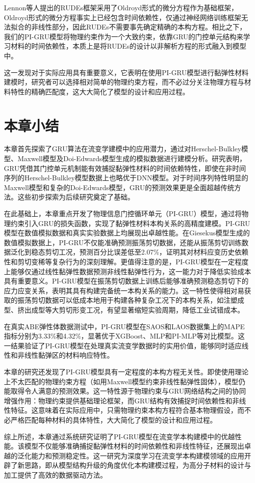 Lennon等人提出的RUDEs框架采用了Oldroyd形式的微分方程作为基础框架，Oldroyd形式的微分方程事实上已经包含时间依赖性，仅通过神经网络训练框架无法拟合的非线性部分，因此RUDEs不需要事先确定精确的本构方程\cite{lennonScientificMachineLearning2023a}。相比之下，我们的PI-GRU模型将物理约束作为一个大致约束，依靠GRU的门控单元结构来学习材料的时间依赖性，本质上是将RUDEs的设计以非解析方程的形式融入到模型中。

这一发现对于实际应用具有重要意义，它表明在使用PI-GRU模型进行黏弹性材料建模时，研究者可以选择相对简单的物理约束方程，而不必过分关注物理方程与材料特性的精确匹配度，这大大简化了模型的设计和应用过程。


\section{本章小结}

本章首先探索了GRU算法在流变学建模中的应用潜力，通过对Herschel-Bulkley模型、Maxwell模型及Doi-Edwards模型生成的模拟数据进行建模分析。研究表明，GRU凭借其门控单元机制能有效捕捉黏弹性材料的时间依赖特性，即使在非时间序列的Herschel-Bulkley模型数据上也略优于DNN模型。对于时间序列特性明显的Maxwell模型和复杂的Doi-Edwards模型，GRU的预测效果更是全面超越传统方法。这些初步探索为后续研究奠定了基础。

在此基础上，本章重点开发了物理信息门控循环单元（PI-GRU）模型，通过将物理约束引入GRU的损失函数，实现了黏弹性材料本构关系的高精度建模。PI-GRU模型在数值模拟数据和真实实验数据上均展现出卓越性能。在Giesekus模型生成的数值模拟数据上，PI-GRU不仅能准确预测振荡剪切数据，还能从振荡剪切训练数据泛化到稳态剪切工况，预测百分比误差低至2.07\%，证明其对材料应变历史依赖性和剪切变稀等复杂行为的深刻理解。更值得注意的是，PI-GRU模型在一定程度上能够仅通过线性黏弹性数据预测非线性黏弹性行为，这一能力对于降低实验成本具有重要意义。PI-GRU模型在振荡剪切数据上训练后能够准确预测稳态剪切下的应力应变关系，表明其具有构建完备统一本构关系的能力。这一特性使得相对易获取的振荡剪切数据可以低成本地用于构建各种复杂工况下的本构关系，如注塑成型、挤出成型等大剪切形变工况，有望显著缩短实验周期，降低工业试错成本。

在真实ABE弹性体数据测试中，PI-GRU模型在SAOS和LAOS数据集上的MAPE指标分别为3.33\%和4.32\%，显著优于XGBoost、MLP和PI-MLP等对比模型。这一结果验证了PI-GRU模型在处理真实流变学数据时的实用价值，能够同时适应线性和非线性黏弹区的材料响应特性。

本章的研究还发现了PI-GRU模型具有一定程度的本构方程无关性。即使使用理论上不太匹配的物理约束方程（如用Maxwell模型约束非线性黏弹性固体），模型仍能取得令人满意的预测效果。这一特性源于物理约束与GRU网络结构之间的协同增强作用：物理约束提供基础理论框架，而GRU结构有效捕捉时间依赖性和非线性特征。这意味着在实际应用中，只需物理约束本构方程符合基本物理假设，而不必严格匹配每种材料的具体特性，大大简化了模型的设计和应用过程。


综上所述，本章通过系统研究证明了PI-GRU模型在流变学本构建模中的优越性能。该模型不仅能够准确捕捉黏弹性材料的时间依赖性和非线性特征，还展现出卓越的泛化能力和预测稳定性。这一研究为深度学习在流变学本构建模领域的应用开辟了新思路，即从模型结构升级的角度优化本构建模过程，为高分子材料的设计与加工提供了高效的数据驱动方法。